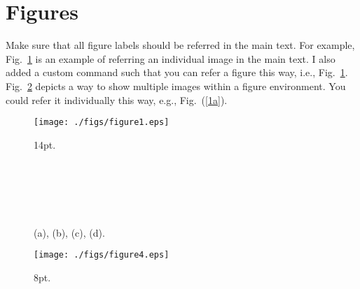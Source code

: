 \documentclass[conference, a4paper]{IEEEtran}
\newcommand\figref{Fig.~\ref}
\begin{document}
\lipsum[1]


\section{Figures}
\label{sec:figures}

Make sure that all figure labels should be referred in the main text.
For example, Fig.~\ref{fig:figure1} is an example of referring an individual image in the main text.
I also added a custom command such that you can refer a figure this way, i.e., \figref{fig:figure1}.
Fig.~\ref{fig:figure4x1} depicts a way to show multiple images within a figure environment.
You could refer it individually this way, e.g., Fig.~(\ref{1a}).


    \begin{figure}[]
      \begin{center}{}
          \texttt{[image: ./figs/figure1.eps]}
          \caption{14pt.}
          \label{fig:figure1}
      \end{center}
    \end{figure}

    \begin{figure}[]
        \centering
      \\
        \\
        \\\
      \caption{(a), (b), (c), (d).}
      \label{fig:figure4x1} 
    \end{figure}
    
    \begin{figure*}[]
      \begin{center}{}
          \texttt{[image: ./figs/figure4.eps]}
          \caption{8pt.}
          \label{fig:figurefull}
      \end{center}
    \end{figure*}




\end{document}
